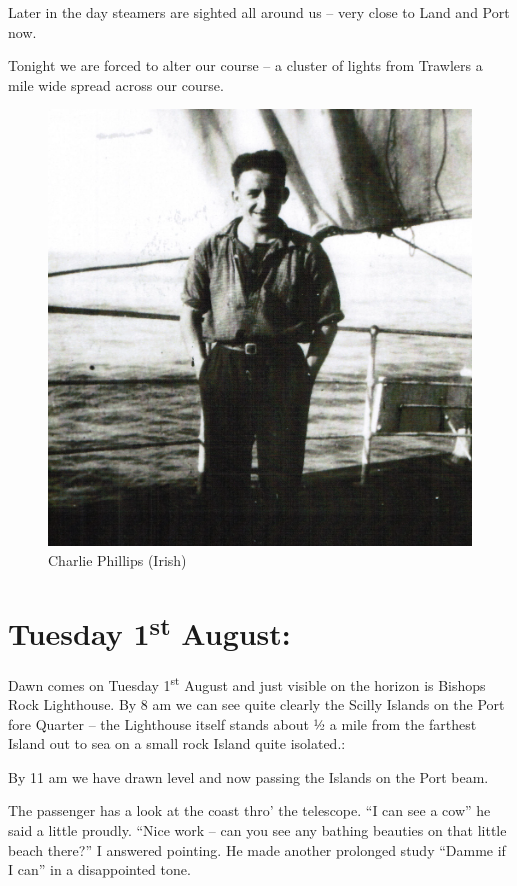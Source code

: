 \documentclass[
  11pt,
  msmallroyalvopaper
]{memoir}
\begin{document}
Later in the day steamers are sighted all around us -- very close to
Land and Port now.

Tonight we are forced to alter our course -- a cluster of lights from
Trawlers a mile wide spread across our course.

\begin{figure}
\centering
\includegraphics{./images/image031.png}
\caption{Charlie Phillips (Irish)}
\end{figure}

\hypertarget{tuesday-1st-august}{%
\section{\texorpdfstring{Tuesday 1\textsuperscript{st}
August:}{Tuesday 1st August:}}\label{tuesday-1st-august}}

Dawn comes on Tuesday 1\textsuperscript{st} August and just visible on
the horizon is Bishops Rock Lighthouse. By 8 am we can see quite clearly
the Scilly Islands on the Port fore Quarter -- the Lighthouse itself
stands about ½ a mile from the farthest Island out to sea on a small
rock Island quite isolated.:

By 11 am we have drawn level and now passing the Islands on the Port
beam.

The passenger has a look at the coast thro' the telescope. ``I can see a
cow'' he said a little proudly. ``Nice work -- can you see any bathing
beauties on that little beach there?'' I answered pointing. He made
another prolonged study ``Damme if I can'' in a disappointed tone.
\end{document}
